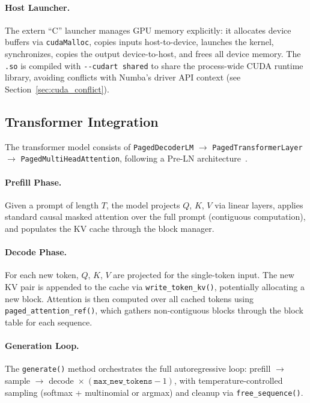 \documentclass{article}
\begin{document}
\paragraph{Host Launcher.}
The extern ``C'' launcher manages GPU memory explicitly: it allocates device buffers via \texttt{cudaMalloc}, copies inputs host-to-device, launches the kernel, synchronizes, copies the output device-to-host, and frees all device memory.
The \texttt{.so} is compiled with \texttt{-{}-cudart shared} to share the process-wide CUDA runtime library, avoiding conflicts with Numba's driver API context (see Section~\ref{sec:cuda_conflict}).

\subsection{Transformer Integration}
\label{sec:transformer}

The transformer model consists of \texttt{PagedDecoderLM} $\to$ \texttt{PagedTransformerLayer} $\to$ \texttt{PagedMultiHeadAttention}, following a Pre-LN architecture~\cite{xiong2020layer}.

\paragraph{Prefill Phase.}
Given a prompt of length $T$, the model projects $Q$, $K$, $V$ via linear layers, applies standard causal masked attention over the full prompt (contiguous computation), and populates the KV cache through the block manager.

\paragraph{Decode Phase.}
For each new token, $Q$, $K$, $V$ are projected for the single-token input.
The new KV pair is appended to the cache via \texttt{write\_token\_kv()}, potentially allocating a new block.
Attention is then computed over all cached tokens using \texttt{paged\_attention\_ref()}, which gathers non-contiguous blocks through the block table for each sequence.

\paragraph{Generation Loop.}
The \texttt{generate()} method orchestrates the full autoregressive loop: prefill $\to$ sample $\to$ decode~$\times~(\texttt{max\_new\_tokens} - 1)$, with temperature-controlled sampling (softmax + multinomial or argmax) and cleanup via \texttt{free\_sequence()}.
\end{document}
